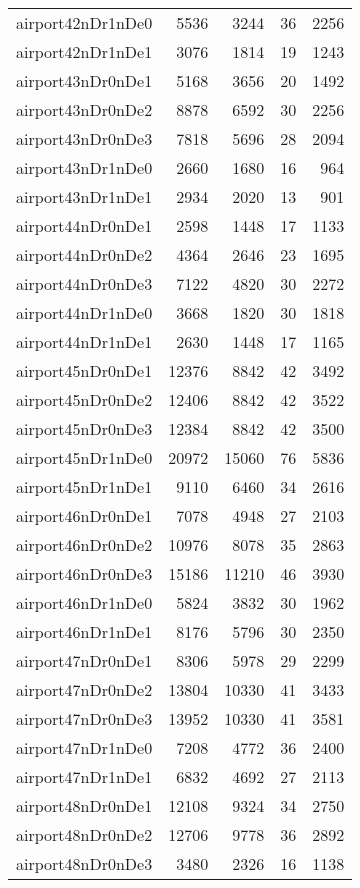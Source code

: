 \begin{tabular}{lrrrr}
airport42nDr1nDe0 & 5536 & 3244 & 36 & 2256 \\
airport42nDr1nDe1 & 3076 & 1814 & 19 & 1243 \\
airport43nDr0nDe1 & 5168 & 3656 & 20 & 1492 \\
airport43nDr0nDe2 & 8878 & 6592 & 30 & 2256 \\
airport43nDr0nDe3 & 7818 & 5696 & 28 & 2094 \\
airport43nDr1nDe0 & 2660 & 1680 & 16 & 964 \\
airport43nDr1nDe1 & 2934 & 2020 & 13 & 901 \\
airport44nDr0nDe1 & 2598 & 1448 & 17 & 1133 \\
airport44nDr0nDe2 & 4364 & 2646 & 23 & 1695 \\
airport44nDr0nDe3 & 7122 & 4820 & 30 & 2272 \\
airport44nDr1nDe0 & 3668 & 1820 & 30 & 1818 \\
airport44nDr1nDe1 & 2630 & 1448 & 17 & 1165 \\
airport45nDr0nDe1 & 12376 & 8842 & 42 & 3492 \\
airport45nDr0nDe2 & 12406 & 8842 & 42 & 3522 \\
airport45nDr0nDe3 & 12384 & 8842 & 42 & 3500 \\
airport45nDr1nDe0 & 20972 & 15060 & 76 & 5836 \\
airport45nDr1nDe1 & 9110 & 6460 & 34 & 2616 \\
airport46nDr0nDe1 & 7078 & 4948 & 27 & 2103 \\
airport46nDr0nDe2 & 10976 & 8078 & 35 & 2863 \\
airport46nDr0nDe3 & 15186 & 11210 & 46 & 3930 \\
airport46nDr1nDe0 & 5824 & 3832 & 30 & 1962 \\
airport46nDr1nDe1 & 8176 & 5796 & 30 & 2350 \\
airport47nDr0nDe1 & 8306 & 5978 & 29 & 2299 \\
airport47nDr0nDe2 & 13804 & 10330 & 41 & 3433 \\
airport47nDr0nDe3 & 13952 & 10330 & 41 & 3581 \\
airport47nDr1nDe0 & 7208 & 4772 & 36 & 2400 \\
airport47nDr1nDe1 & 6832 & 4692 & 27 & 2113 \\
airport48nDr0nDe1 & 12108 & 9324 & 34 & 2750 \\
airport48nDr0nDe2 & 12706 & 9778 & 36 & 2892 \\
airport48nDr0nDe3 & 3480 & 2326 & 16 & 1138 \\

\end{tabular}
